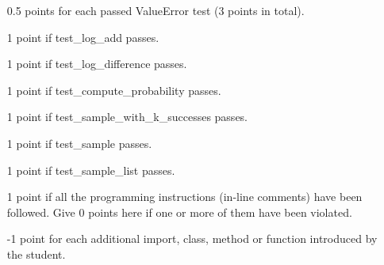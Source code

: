 \documentclass[11pt, leqno, a4paper]{article}
\begin{document}
\begin{itemize}
\item[0.5 points] for each passed ValueError test (3 points in total).
\item[1 point] if test\_log\_add passes.
\item[1 point] if test\_log\_difference passes.
\item[1 point] if test\_compute\_probability passes.
\item[1 point] if test\_sample\_with\_k\_successes passes.
\item[1 point] if test\_sample passes.
\item[1 point] if test\_sample\_list passes.
\item[1 point] if all the programming instructions (in-line comments) have been followed. Give 0 points here
if one or more of them have been violated.
\item[-1 point] for each additional import, class, method or function introduced by the student.
\end{itemize} 
\end{document}
